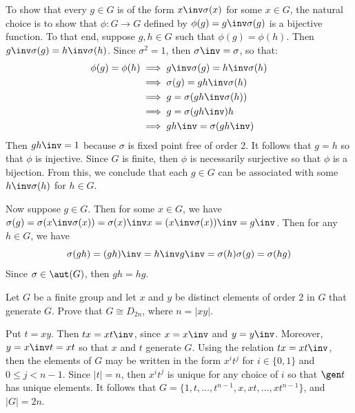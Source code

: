 \begin{problems}
    \begin{sol}
        To show that every $g \in G$ is of the form $x\inv\sigma(x)$ for some $x \in G$, the natural choice is to show that $\phi : G \to G$ defined by $\phi(g) = g\inv\sigma(g)$ is a bijective function. To that end, suppose $g, h \in G$ such that $\phi(g) = \phi(h)$. Then $g\inv \sigma(g) = h\inv \sigma(h)$. Since $\sigma^2 = 1$, then $\sigma\inv = \sigma$, so that:
        \begin{align*}
            \phi(g) = \phi(h) & \implies g\inv \sigma(g) = h\inv \sigma(h) \\
            & \implies \sigma(g) = gh\inv \sigma(h) \\
            & \implies g = \sigma(gh\inv \sigma(h)) \\
            & \implies g = \sigma(gh\inv)h \\
            &\implies gh\inv = \sigma(gh\inv)
        \end{align*}
        Then $gh\inv = 1$ because $\sigma$ is fixed point free of order 2. It follows that $g = h$ so that $\phi$ is injective. Since $G$ is finite, then $\phi$ is necessarily surjective so that $\phi$ is a bijection. From this, we conclude that each $g \in G$ can be associated with some $h\inv \sigma(h)$ for $h \in G$.
        
        Now suppose $g \in G$. Then for some $x \in G$, we have $\sigma(g) = \sigma(x\inv \sigma(x)) = \sigma(x)\inv x = (x\inv\sigma (x))\inv = g\inv$. Then for any $h \in G$, we have
        \[\sigma(gh) = (gh)\inv = h\inv g\inv = \sigma(h)\sigma(g) = \sigma(hg)\]
        Since $\sigma \in \aut(G)$, then $gh = hg$.
    \end{sol}
    \item Let $G$ be a finite group and let $x$ and $y$ be distinct elements of order 2 in $G$ that generate $G$. Prove that $G \cong D_{2n}$, where $n = |xy|$.
    \begin{sol}
        Put $t = xy$. Then $tx = xt\inv$, since $x = x\inv$ and $y = y\inv$. Moreover, $y = x\inv t = xt$ so that $x$ and $t$ generate $G$. Using the relation $tx = xt\inv$, then the elements of $G$ may be written in the form $x^it^j$ for $i \in \{0, 1\}$ and $0 \leq j < n - 1$. Since $|t| = n$, then $x^it^j$ is unique for any choice of $i$ so that $\gen t$ has unique elements. It follows that $G = \{1, t, \ldots, t^{n - 1}, x, xt, \ldots, xt^{n - 1}\}$, and $|G| = 2n$.
        

\end{sol}
\end{problems}
